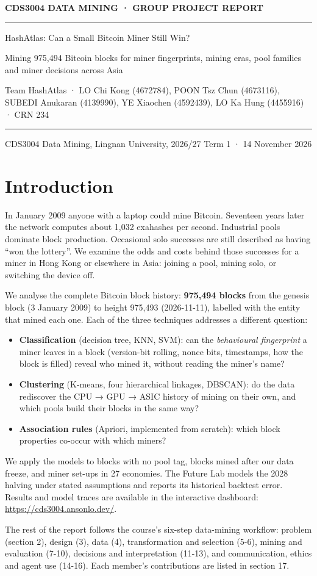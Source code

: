 \documentclass[
  11pt,
  a4paper,
]{article}
\providecommand{\tightlist}{%
  \setlength{\itemsep}{0pt}\setlength{\parskip}{0pt}}
\newcommand{\HashAtlasTitlePage}{%
  \begin{titlepage}
    \thispagestyle{empty}
    \vspace*{30mm}
    {\sffamily\small\bfseries\color{ReportAccent}\MakeUppercase{\ReportKind}\par}
    \vspace{6mm}
    {\color{ReportRule}\rule{\linewidth}{0.8pt}\par}
    \vspace{10mm}
    {\sffamily\fontsize{28}{34}\selectfont\bfseries\color{ReportInk}\raggedright\ReportTitle\par}
    \vspace{8mm}
    {\sffamily\Large\color{ReportInkTwo}\raggedright\ReportSubtitle\par}
    \vspace{8mm}
    {\sffamily\normalsize\color{ReportInk}\raggedright\ReportTeam\par}
    \vspace{10mm}
    {\color{ReportRule}\rule{\linewidth}{0.8pt}\par}
    \vspace{6mm}
    {\sffamily\normalsize\color{ReportMuted}\raggedright\ReportDate\par}
    \vfill
  \end{titlepage}
}
\newcommand{\ReportTitle}{HashAtlas: Can a Small Bitcoin Miner Still
Win?}
\newcommand{\ReportSubtitle}{Mining 975,494 Bitcoin blocks for miner
fingerprints, mining eras, pool families and miner decisions across
Asia}
\newcommand{\ReportDate}{CDS3004 Data Mining, Lingnan University,
2026/27 Term 1 · 14 November 2026}
\newcommand{\ReportTeam}{Team HashAtlas · LO Chi Kong (4672784), POON
Tsz Chun (4673116), SUBEDI Anukaran (4139990), YE Xiaochen (4592439), LO
Ka Hung (4455916) · CRN 234}
\newcommand{\ReportKind}{CDS3004 Data Mining · Group Project Report}
\begin{document}
\HashAtlasTitlePage

{
\hypersetup{linkcolor=ReportInk}
\setcounter{tocdepth}{1}
\tableofcontents
}
\clearpage
{}
\pagestyle{report}


\section{Introduction}\label{introduction}

In January 2009 anyone with a laptop could mine Bitcoin. Seventeen years
later the network computes about 1,032 exahashes per second. Industrial
pools dominate block production. Occasional solo successes are still
described as having ``won the lottery''. We examine the odds and costs
behind those successes for a miner in Hong Kong or elsewhere in Asia:
joining a pool, mining solo, or switching the device off.

We analyse the complete Bitcoin block history: \textbf{975,494 blocks}
from the genesis block (3 January 2009) to height 975,493 (2026-11-11),
labelled with the entity that mined each one. Each of the three
techniques addresses a different question:

\begin{itemize}
\tightlist
\item
  \textbf{Classification} (decision tree, KNN, SVM): can the
  \emph{behavioural fingerprint} a miner leaves in a block (version-bit
  rolling, nonce bits, timestamps, how the block is filled) reveal who
  mined it, without reading the miner's name?
\item
  \textbf{Clustering} (K-means, four hierarchical linkages, DBSCAN): do
  the data rediscover the CPU → GPU → ASIC history of mining on their
  own, and which pools build their blocks in the same way?
\item
  \textbf{Association rules} (Apriori, implemented from scratch): which
  block properties co-occur with which miners?
\end{itemize}

We apply the models to blocks with no pool tag, blocks mined after our
data freeze, and miner set-ups in 27 economies. The Future Lab models
the 2028 halving under stated assumptions and reports its historical
backtest error. Results and model traces are available in the
interactive dashboard: \url{https://cds3004.ansonlo.dev/}.

The rest of the report follows the course's six-step data-mining
workflow: problem (section 2), design (3), data (4), transformation and
selection (5-6), mining and evaluation (7-10), decisions and
interpretation (11-13), and communication, ethics and agent use (14-16).
Each member's contributions are listed in section 17.
\end{document}
